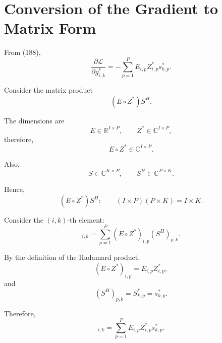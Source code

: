 \documentclass[12pt,a4paper]{article}
\begin{document}
\section{Conversion of the Gradient to Matrix Form}

From (188),
\begin{equation}
\frac{\partial\mathcal L}{\partial g_{i,k}^*}
=
-\sum_{p=1}^{P}
E_{i,p}
Z_{i,p}^*s_{k,p}^*.
\tag{191}
\end{equation}

Consider the matrix product
\begin{equation}
(E\circ Z^*)S^H.
\tag{192}
\end{equation}

The dimensions are
\begin{equation}
E\in\mathbb{R}^{I\times P},
\qquad
Z^*\in\mathbb{C}^{I\times P},
\tag{193}
\end{equation}
therefore,
\begin{equation}
E\circ Z^*
\in
\mathbb{C}^{I\times P}.
\tag{194}
\end{equation}

Also,
\begin{equation}
S\in\mathbb{C}^{K\times P},
\qquad
S^H\in\mathbb{C}^{P\times K}.
\tag{195}
\end{equation}

Hence,
\begin{equation}
(E\circ Z^*)S^H:
\qquad
(I\times P)(P\times K)
=
I\times K.
\tag{196}
\end{equation}

Consider the $(i,k)$-th element:
\begin{equation}
[(E\circ Z^*)S^H]_{i,k}
=
\sum_{p=1}^{P}
(E\circ Z^*)_{i,p}
(S^H)_{p,k}.
\tag{197}
\end{equation}

By the definition of the Hadamard product,
\begin{equation}
(E\circ Z^*)_{i,p}
=
E_{i,p}Z_{i,p}^*,
\tag{198}
\end{equation}
and
\begin{equation}
(S^H)_{p,k}
=
S_{k,p}^*
=
s_{k,p}^*.
\tag{199}
\end{equation}

Therefore,
\begin{equation}
[(E\circ Z^*)S^H]_{i,k}
=
\sum_{p=1}^{P}
E_{i,p}Z_{i,p}^*s_{k,p}^*.
\tag{200}
\end{equation}
\end{document}
